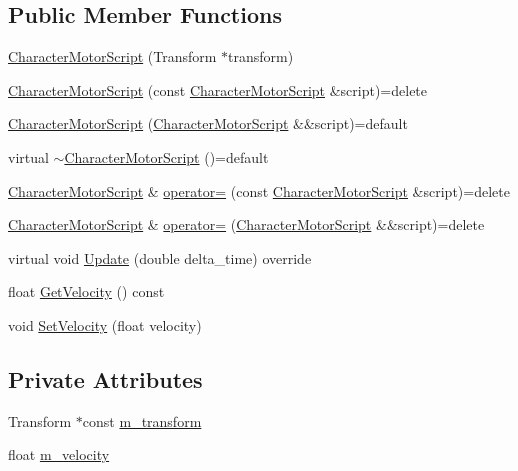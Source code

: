 \subsection*{Public Member Functions}
\begin{DoxyCompactItemize}
\item 
\hyperlink{classmage_1_1_character_motor_script_af819140d0ebda767e9b82826c50972de}{Character\+Motor\+Script} (Transform $\ast$transform)
\item 
\hyperlink{classmage_1_1_character_motor_script_aa8b4b2c6eba7077677db51e24c2a9a36}{Character\+Motor\+Script} (const \hyperlink{classmage_1_1_character_motor_script}{Character\+Motor\+Script} \&script)=delete
\item 
\hyperlink{classmage_1_1_character_motor_script_a944682d8ff570a141e60cdd2d16aa3ad}{Character\+Motor\+Script} (\hyperlink{classmage_1_1_character_motor_script}{Character\+Motor\+Script} \&\&script)=default
\item 
virtual \hyperlink{classmage_1_1_character_motor_script_a03e8cdb2e30e21fe3a84f36101a169e3}{$\sim$\+Character\+Motor\+Script} ()=default
\item 
\hyperlink{classmage_1_1_character_motor_script}{Character\+Motor\+Script} \& \hyperlink{classmage_1_1_character_motor_script_a5b66cbbe6b829fe56a1bba5f9093b36e}{operator=} (const \hyperlink{classmage_1_1_character_motor_script}{Character\+Motor\+Script} \&script)=delete
\item 
\hyperlink{classmage_1_1_character_motor_script}{Character\+Motor\+Script} \& \hyperlink{classmage_1_1_character_motor_script_a05e8822fa633d8642702d125b26069f7}{operator=} (\hyperlink{classmage_1_1_character_motor_script}{Character\+Motor\+Script} \&\&script)=delete
\item 
virtual void \hyperlink{classmage_1_1_character_motor_script_af09581e810c02ca4a19ecbaf0d7580bb}{Update} (double delta\+\_\+time) override
\item 
float \hyperlink{classmage_1_1_character_motor_script_a0c512015222e3f332429df414c06862b}{Get\+Velocity} () const
\item 
void \hyperlink{classmage_1_1_character_motor_script_a3fd91c324e837b9d22e19d74478caec0}{Set\+Velocity} (float velocity)
\end{DoxyCompactItemize}
\subsection*{Private Attributes}
\begin{DoxyCompactItemize}
\item 
Transform $\ast$const \hyperlink{classmage_1_1_character_motor_script_a7331e960455b72ceb858254ccc7108f1}{m\+\_\+transform}
\item 
float \hyperlink{classmage_1_1_character_motor_script_a02441cc4c84ba12811845b7f966f4069}{m\+\_\+velocity}
\end{DoxyCompactItemize}
